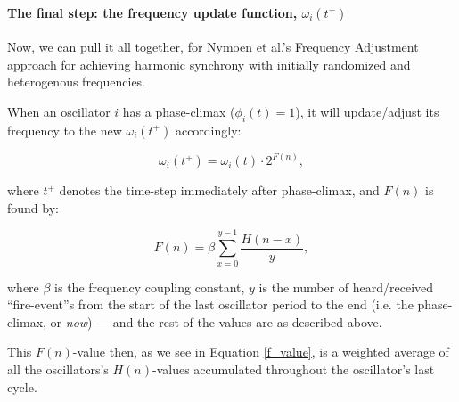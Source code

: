 		\paragraph{The final step: the frequency update function, $\omega_i(t^+)$}
		
		Now, we can pull it all together, for Nymoen et al.'s Frequency Adjustment approach for achieving harmonic synchrony with initially randomized and heterogenous frequencies.

		When an oscillator $i$ has a phase-climax ($\phi_i(t)=1$), it will update/adjust its frequency to the new $\omega_i(t^+)$ accordingly:

		\begin{equation}
		\label{freq_adj}
			\omega_i(t^+) = \omega_i(t) \cdot 2^{F(n)},
		\end{equation}

		where $t^+$ denotes the time-step immediately after phase-climax, and $F(n)$ is found by:

		\begin{equation}
		\label{f_value}
			F(n) = \beta\sum_{x=0}^{y-1}\frac{H(n-x)}{y},
		\end{equation}

		where $\beta$ is the frequency coupling constant, $y$ is the number of heard/received ``fire-event''s from the start of the last oscillator period to the end (i.e. the phase-climax, or \textit{now}) — and the rest of the values are as described above.

		This $F(n)$-value then, as we see in Equation \eqref{f_value}, is a weighted average of all the oscillators's $H(n)$-values accumulated throughout the oscillator's last cycle.

